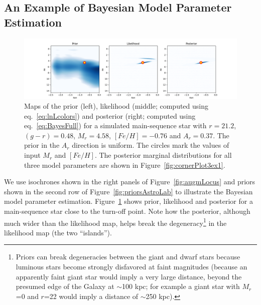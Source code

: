  
\subsection{An Example of Bayesian Model Parameter Estimation}


\begin{figure}[t!]
\hskip -0.7in
\includegraphics[width=1.2\textwidth,angle=0]{figures/bayesPanels_ex1.png}
\caption{Maps of the prior (left), likelihood (middle; computed using eq.~\ref{eq:lnLcolors}) and posterior (right;
computed using eq.~\ref{eq:BayesFull}) for a simulated main-sequence star with $r=21.2$, $(g-r)=0.48$,
$M_r= 4.58$, $[Fe/H]=-0.76$ and $A_r=0.37$. The prior in the $A_r$ direction is uniform. The circles mark
the values of input $M_r$ and $[Fe/H]$. The posterior marginal distributions for all three model parameters
are shown in Figure~\ref{fig:cornerPlot3ex1}.
}
\label{fig:bayesPanels}
\end{figure}
 
We use isochrones shown in the right panels of Figure~\ref{fig:augmLocus} and priors shown
in the second row of Figure~\ref{fig:priorsAstroLab} to illustrate the Bayesian model parameter estimation. 
Figure~\ref{fig:bayesPanels} shows prior, likelihood and posterior for a main-sequence star close to the
turn-off point. Note how the posterior, although much wider than the likelihood map, helps break the
degeneracy\footnote{Priors can break degeneracies between the giant and dwarf stars because luminous
stars become strongly disfavored at faint magnitudes (because an apparently faint giant star would imply
a very large distance, beyond the presumed edge of the Galaxy at $\sim$100 kpc; for example a giant star
with $M_r$=0 and $r$=22 would imply a distance of $\sim$250 kpc).} in the likelihood map (the two ``islands'').


